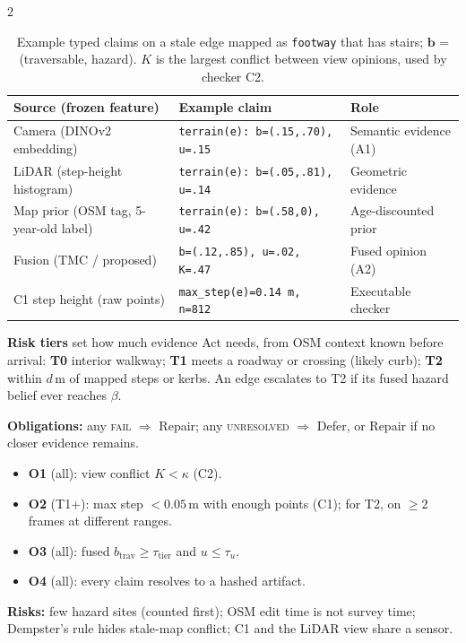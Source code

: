 \documentclass[10pt]{article}
\newcommand{\cl}[1]{\texttt{#1}}
\begin{document}
\begin{multicols*}{2}
\begin{table}
	\centering
	\small
	\begin{tabular}{lll}
		\hline
		\textbf{Source (frozen feature)} & \textbf{Example claim} & \textbf{Role} \\
		\hline
		Camera (DINOv2~\cite{oquab2024dinov} embedding) & \cl{terrain(e): b=(.15,.70), u=.15} & Semantic evidence (A1) \\
		LiDAR (step-height histogram) & \cl{terrain(e): b=(.05,.81), u=.14} & Geometric evidence \\
		Map prior (OSM tag, 5-year-old label) & \cl{terrain(e): b=(.58,0), u=.42} & Age-discounted prior \\
		Fusion (TMC / proposed) & \cl{b=(.12,.85), u=.02, K=.47} & Fused opinion (A2) \\
		C1 step height (raw points) & \cl{max\_step(e)=0.14\,m, n=812} & Executable checker \\
		\hline
	\end{tabular}
	\caption{Example typed claims on a stale edge mapped as \cl{footway} that has stairs; $\mathbf{b}$ = (traversable, hazard). $K$ is the largest conflict between view opinions, used by checker C2.}
	\label{tbl:claims}
\end{table}

\textbf{Risk tiers} set how much evidence Act needs, from OSM context known before arrival:
\textbf{T0} interior walkway; \textbf{T1} meets a roadway or crossing (likely curb); \textbf{T2} within
$d$\,m of mapped steps or kerbs. An edge escalates to T2 if its fused hazard belief ever reaches $\beta$.

\textbf{Obligations:} any \textsc{fail} $\Rightarrow$ Repair; any \textsc{unresolved} $\Rightarrow$ Defer,
or Repair if no closer evidence remains.
\begin{itemize}\setlength\itemsep{0pt}\setlength\parskip{0pt}
	\item \textbf{O1} (all): view conflict $K < \kappa$ (C2).
	\item \textbf{O2} (T1+): max step $< 0.05$\,m with enough points (C1); for T2, on $\ge 2$ frames at different ranges.
	\item \textbf{O3} (all): fused $b_{\text{trav}} \ge \tau_{\text{tier}}$ and $u \le \tau_u$.
	\item \textbf{O4} (all): every claim resolves to a hashed artifact.
\end{itemize}

\textbf{Risks:} few hazard sites (counted first); OSM edit time is not survey time; Dempster's rule hides stale-map conflict; C1 and the
LiDAR view share a sensor.


\end{multicols*}
\end{document}
